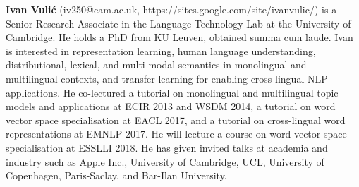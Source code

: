   {\bfseries Ivan Vuli\'{c}} (iv250@cam.ac.uk, https://sites.google.com/site/ivanvulic/) is a Senior Research Associate in the Language Technology Lab at the University of Cambridge. He holds a PhD from KU Leuven, obtained summa cum laude. Ivan is interested in representation learning, human language understanding, distributional, lexical, and multi-modal semantics in monolingual and multilingual contexts, and transfer learning for enabling cross-lingual NLP applications. He co-lectured a tutorial on monolingual and multilingual topic models and applications at ECIR 2013 and WSDM 2014, a tutorial on word vector space specialisation at EACL 2017, and a tutorial on cross-lingual word representations at EMNLP 2017. He will lecture a course on word vector space specialisation at ESSLLI 2018. He has given invited talks at academia and industry such as Apple Inc., University of Cambridge, UCL, University of Copenhagen, Paris-Saclay, and Bar-Ilan University.



